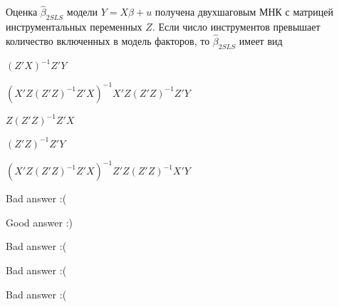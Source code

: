 
\begin{question}
Оценка \(\hat \beta_{2SLS}\) модели \(Y = X\beta + u\) получена двухшаговым МНК с матрицей инструментальных переменных \(Z\).
Если число инструментов превышает количество включенных в модель факторов, то \(\hat \beta_{2SLS}\) имеет вид
\begin{answerlist}
  \item \((Z'X)^{-1}Z'Y\)
  \item \((X'Z(Z'Z)^{-1}Z'X)^{-1}X'Z(Z'Z)^{-1}Z'Y\)
  \item \(Z(Z'Z)^{-1}Z'X\)
  \item \((Z'Z)^{-1}Z'Y\)
  \item \((X'Z(Z'Z)^{-1}Z'X)^{-1}Z'Z(Z'Z)^{-1}X'Y\)
\end{answerlist}
\end{question}

\begin{solution}
\begin{answerlist}
  \item Bad answer :(
  \item Good answer :)
  \item Bad answer :(
  \item Bad answer :(
  \item Bad answer :(
\end{answerlist}
\end{solution}

